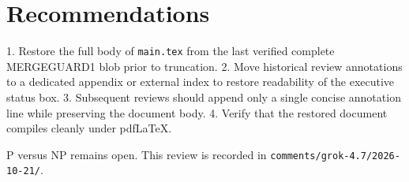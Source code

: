 \documentclass[11pt]{article}
\begin{document}
\section{Recommendations}
1. Restore the full body of \texttt{main.tex} from the last verified complete MERGEGUARD1 blob prior to truncation.
2. Move historical review annotations to a dedicated appendix or external index to restore readability of the executive status box.
3. Subsequent reviews should append only a single concise annotation line while preserving the document body.
4. Verify that the restored document compiles cleanly under pdfLaTeX.

P versus NP remains open. This review is recorded in \texttt{comments/grok-4.7/2026-10-21/}.

\end{document}
